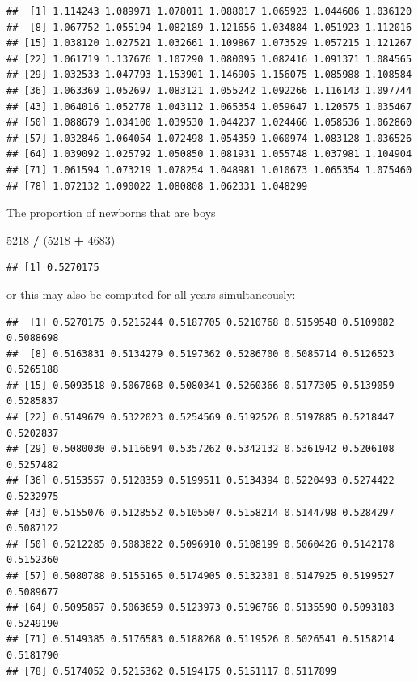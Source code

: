 \documentclass[]{article}
\newenvironment{Shaded}{\begin{snugshade}}{\end{snugshade}}
\newcommand{\DecValTok}[1]{\textcolor[rgb]{0.00,0.00,0.81}{#1}}
\newcommand{\StringTok}[1]{\textcolor[rgb]{0.31,0.60,0.02}{#1}}
\newcommand{\OperatorTok}[1]{\textcolor[rgb]{0.81,0.36,0.00}{\textbf{#1}}}
\newcommand{\NormalTok}[1]{#1}
\begin{document}
\begin{verbatim}
##  [1] 1.114243 1.089971 1.078011 1.088017 1.065923 1.044606 1.036120
##  [8] 1.067752 1.055194 1.082189 1.121656 1.034884 1.051923 1.112016
## [15] 1.038120 1.027521 1.032661 1.109867 1.073529 1.057215 1.121267
## [22] 1.061719 1.137676 1.107290 1.080095 1.082416 1.091371 1.084565
## [29] 1.032533 1.047793 1.153901 1.146905 1.156075 1.085988 1.108584
## [36] 1.063369 1.052697 1.083121 1.055242 1.092266 1.116143 1.097744
## [43] 1.064016 1.052778 1.043112 1.065354 1.059647 1.120575 1.035467
## [50] 1.088679 1.034100 1.039530 1.044237 1.024466 1.058536 1.062860
## [57] 1.032846 1.064054 1.072498 1.054359 1.060974 1.083128 1.036526
## [64] 1.039092 1.025792 1.050850 1.081931 1.055748 1.037981 1.104904
## [71] 1.061594 1.073219 1.078254 1.048981 1.010673 1.065354 1.075460
## [78] 1.072132 1.090022 1.080808 1.062331 1.048299
\end{verbatim}

The proportion of newborns that are boys

\begin{Shaded}
\begin{Highlighting}[]
\DecValTok{5218} \OperatorTok{/}\StringTok{ }\NormalTok{(}\DecValTok{5218} \OperatorTok{+}\StringTok{ }\DecValTok{4683}\NormalTok{)}
\end{Highlighting}
\end{Shaded}

\begin{verbatim}
## [1] 0.5270175
\end{verbatim}

or this may also be computed for all years simultaneously:

\begin{Shaded}
\end{Shaded}

\begin{verbatim}
##  [1] 0.5270175 0.5215244 0.5187705 0.5210768 0.5159548 0.5109082 0.5088698
##  [8] 0.5163831 0.5134279 0.5197362 0.5286700 0.5085714 0.5126523 0.5265188
## [15] 0.5093518 0.5067868 0.5080341 0.5260366 0.5177305 0.5139059 0.5285837
## [22] 0.5149679 0.5322023 0.5254569 0.5192526 0.5197885 0.5218447 0.5202837
## [29] 0.5080030 0.5116694 0.5357262 0.5342132 0.5361942 0.5206108 0.5257482
## [36] 0.5153557 0.5128359 0.5199511 0.5134394 0.5220493 0.5274422 0.5232975
## [43] 0.5155076 0.5128552 0.5105507 0.5158214 0.5144798 0.5284297 0.5087122
## [50] 0.5212285 0.5083822 0.5096910 0.5108199 0.5060426 0.5142178 0.5152360
## [57] 0.5080788 0.5155165 0.5174905 0.5132301 0.5147925 0.5199527 0.5089677
## [64] 0.5095857 0.5063659 0.5123973 0.5196766 0.5135590 0.5093183 0.5249190
## [71] 0.5149385 0.5176583 0.5188268 0.5119526 0.5026541 0.5158214 0.5181790
## [78] 0.5174052 0.5215362 0.5194175 0.5151117 0.5117899
\end{verbatim}
\end{document}
